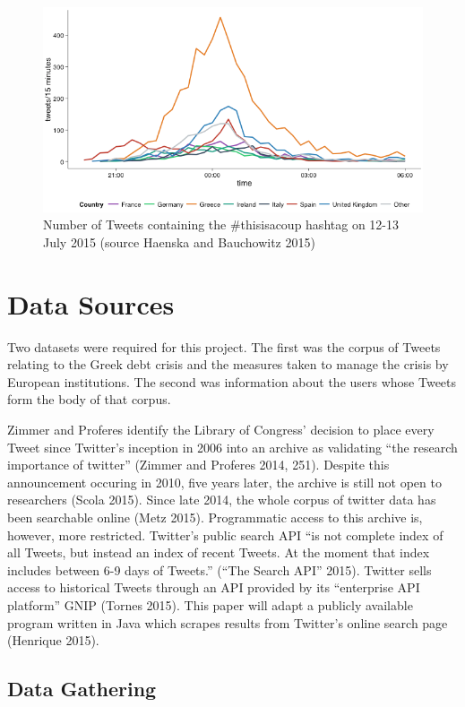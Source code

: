 \documentclass[]{article}
\begin{document}
\begin{figure}[htbp]
\centering
\includegraphics{../../img/Greece-twitter-2.png}
\caption{Number of Tweets containing the \#thisisacoup hashtag on 12-13
July 2015 (source Haenska and Bauchowitz 2015)}
\end{figure}

\section{Data Sources}\label{data-sources}

Two datasets were required for this project. The first was the corpus of
Tweets relating to the Greek debt crisis and the measures taken to
manage the crisis by European institutions. The second was information
about the users whose Tweets form the body of that corpus.

Zimmer and Proferes identify the Library of Congress' decision to place
every Tweet since Twitter's inception in 2006 into an archive as
validating ``the research importance of twitter'' (Zimmer and Proferes
2014, 251). Despite this announcement occuring in 2010, five years
later, the archive is still not open to researchers (Scola 2015). Since
late 2014, the whole corpus of twitter data has been searchable online
(Metz 2015). Programmatic access to this archive is, however, more
restricted. Twitter's public search API ``is not complete index of all
Tweets, but instead an index of recent Tweets. At the moment that index
includes between 6-9 days of Tweets.'' (``The Search API'' 2015).
Twitter sells access to historical Tweets through an API provided by its
``enterprise API platform'' GNIP (Tornes 2015). This paper will adapt a
publicly available program written in Java which scrapes results from
Twitter's online search page (Henrique 2015).

\subsection{Data Gathering}\label{data-gathering}
\end{document}

